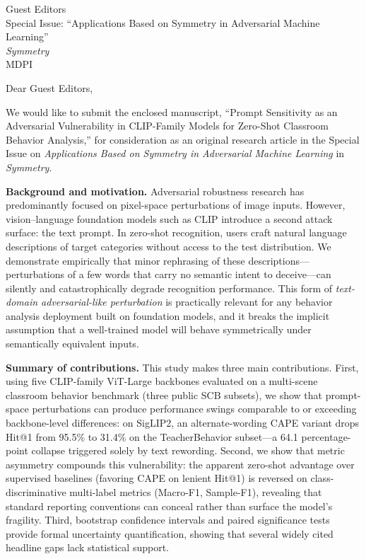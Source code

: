 \documentclass[11pt]{letter}
\date{May 28, 2026}
\begin{document}
\begin{letter}{Guest Editors \\ Special Issue: ``Applications Based on Symmetry in Adversarial Machine Learning'' \\ \textit{Symmetry} \\ MDPI}

\opening{Dear Guest Editors,}

We would like to submit the enclosed manuscript, ``Prompt Sensitivity as an Adversarial Vulnerability in CLIP-Family Models for Zero-Shot Classroom Behavior Analysis,'' for consideration as an original research article in the Special Issue on \textit{Applications Based on Symmetry in Adversarial Machine Learning} in \textit{Symmetry}.

\textbf{Background and motivation.}
Adversarial robustness research has predominantly focused on pixel-space perturbations of image inputs. However, vision--language foundation models such as CLIP introduce a second attack surface: the text prompt. In zero-shot recognition, users craft natural language descriptions of target categories without access to the test distribution. We demonstrate empirically that minor rephrasing of these descriptions---perturbations of a few words that carry no semantic intent to deceive---can silently and catastrophically degrade recognition performance. This form of \emph{text-domain adversarial-like perturbation} is practically relevant for any behavior analysis deployment built on foundation models, and it breaks the implicit assumption that a well-trained model will behave symmetrically under semantically equivalent inputs.

\textbf{Summary of contributions.}
This study makes three main contributions. First, using five CLIP-family ViT-Large backbones evaluated on a multi-scene classroom behavior benchmark (three public SCB subsets), we show that prompt-space perturbations can produce performance swings comparable to or exceeding backbone-level differences: on SigLIP2, an alternate-wording CAPE variant drops Hit@1 from 95.5\% to 31.4\% on the TeacherBehavior subset---a 64.1 percentage-point collapse triggered solely by text rewording. Second, we show that metric asymmetry compounds this vulnerability: the apparent zero-shot advantage over supervised baselines (favoring CAPE on lenient Hit@1) is reversed on class-discriminative multi-label metrics (Macro-F1, Sample-F1), revealing that standard reporting conventions can conceal rather than surface the model's fragility. Third, bootstrap confidence intervals and paired significance tests provide formal uncertainty quantification, showing that several widely cited headline gaps lack statistical support.


\end{letter}
\end{document}

